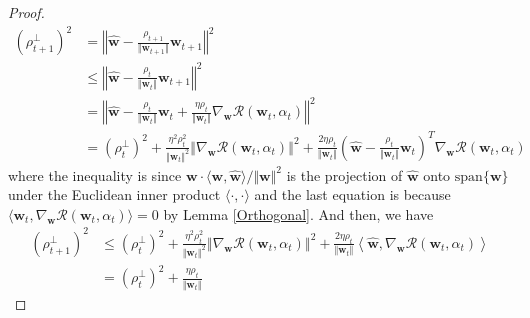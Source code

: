 \documentclass[pdflatex,sn-basic]{sn-jnl}%
\theoremstyle{thmstyleone}%
\begin{document}
\begin{appendices}
\begin{proof}
\begin{equation*}
  \begin{aligned}
    \left(
      {\rho}_{t+1}^{\perp}
    \right)^2 
    & = 
    \left\Vert 
      \hat{\mathbf{w}} - 
      \frac{{\rho}_{t+1}}{\Vert \mathbf{w}_{t+1} \Vert}
      \mathbf{w}_{t+1}
    \right\Vert^2
    \\ & \le 
    \left\Vert 
      \hat{\mathbf{w}} - 
      \frac{{\rho}_{t}}{\Vert \mathbf{w}_{t} \Vert}
      \mathbf{w}_{t+1}
    \right\Vert^2
    \\ & =
    \left\Vert 
      \hat{\mathbf{w}} - \frac{{\rho}_{t}}{\Vert \mathbf{w}_{t} \Vert} \mathbf{w}_{t}
      +
      \frac{\eta {\rho}_{t}}{\Vert \mathbf{w}_{t} \Vert}
      \nabla_{\mathbf{w}} \mathcal{R} \left(\mathbf{w}_t, \alpha_t\right)
    \right\Vert^2
    \\ & =
    \left(
      {\rho}_{t}^{\perp}
    \right)^2 
    +
    \frac{\eta^2 {\rho}_{t}^2}{\Vert \mathbf{w}_{t} \Vert^2}
    \left\Vert
      \nabla_{\mathbf{w}} \mathcal{R} \left(\mathbf{w}_t, \alpha_t\right)
    \right\Vert^2
    +
    \frac{2 \eta {\rho}_{t}}{\Vert \mathbf{w}_{t} \Vert}
    \left(
      \hat{\mathbf{w}} - 
      \frac{{\rho}_{t}}{\Vert \mathbf{w}_{t} \Vert} 
      \mathbf{w}_{t}
    \right)^T
    \nabla_{\mathbf{w}} \mathcal{R} \left(\mathbf{w}_t, \alpha_t\right)
\end{aligned}
\end{equation*}
where 
the inequality is since $\mathbf{w} \cdot \langle \mathbf{w}, \hat{\mathbf{w}}\rangle / \Vert \mathbf{w} \Vert^2$ 
is the projection of $\hat{\mathbf{w}}$ onto $\text{span}\{\mathbf{w}\}$ under the
Euclidean inner product $\langle\cdot, \cdot\rangle$
  and 
the last equation is because $\langle \mathbf{w}_t, \nabla_{\mathbf{w}} \mathcal{R} \left(\mathbf{w}_t, \alpha_t\right) \rangle = 0$ by Lemma \ref{Orthogonal}. And then, we have
\begin{equation*}
\begin{aligned}
\left(
      {\rho}_{t+1}^{\perp}
    \right)^2 
    & \le
    \left(
      {\rho}_{t}^{\perp}
    \right)^2 
    +
    \frac{\eta^2 {\rho}_{t}^2}{\Vert \mathbf{w}_{t} \Vert^2}
    \left\Vert
      \nabla_{\mathbf{w}} \mathcal{R} \left(\mathbf{w}_t, \alpha_t\right)
    \right\Vert^2
    +
    \frac{2 \eta {\rho}_{t}}{\Vert \mathbf{w}_{t} \Vert}
    \left\langle 
    \hat{\mathbf{w}},
    \nabla_{\mathbf{w}} \mathcal{R} \left(\mathbf{w}_t, \alpha_t\right)
    \right\rangle
    \\ & =
    \left(
      {\rho}_{t}^{\perp}
    \right)^2 
    +
    \frac{\eta {\rho}_{t}}{\Vert \mathbf{w}_{t} \Vert}

\end{aligned}
\end{equation*}
\end{proof}
\end{appendices}
\end{document}
